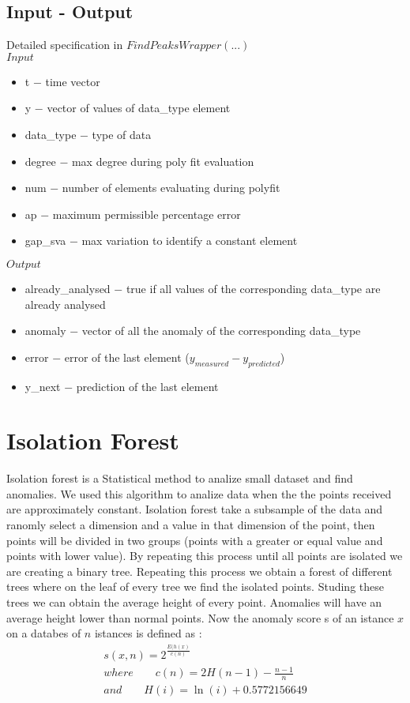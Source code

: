 \documentclass[journal]{IEEEtran}
\begin{document}
\subsection{Input - Output}
Detailed specification in $FindPeaksWrapper(...)$
\\
$Input$
\begin{itemize}
\item t $-$ time vector 
\item y $-$ vector of values of data\_type element
\item data\_type $-$ type of data
\item degree $-$ max degree during poly fit evaluation
\item num $-$ number of elements evaluating during polyfit
\item ap $-$ maximum permissible percentage error
\item gap\_sva $-$ max variation to identify a constant element
\end{itemize}

$Output$
\begin{itemize}
\item already\_analysed $-$ true if all values of the corresponding data\_type are already analysed
\item anomaly $-$ vector of all the anomaly of the corresponding data\_type
\item error $-$ error of the last element ($y_{measured}-y_{predicted}$)
\item y\_next $-$ prediction of the last element
\end{itemize}

\section{Isolation Forest}

Isolation forest is a Statistical method to analize small dataset and find anomalies. We used this algorithm to analize data when the the points received are approximately constant. Isolation forest take a subsample of the data and ranomly select a dimension and a value in that dimension of the point, then points will be divided in two groups (points with a greater or equal value and points with lower value). By repeating this process until all points are isolated we are creating a binary tree. Repeating this process we obtain a forest of different trees where on the leaf of every tree we find the isolated points. Studing these trees we can obtain the average height of every point. Anomalies will have an average height lower than normal points. 
Now the anomaly score s of an istance $x$ on a databes of $n$ istances is defined as :
\begin{gather}
s(x,n)=2^{\frac{E(h(x)}{c(n)}} \\
where \qquad c(n)=2H(n - 1) - \frac{n - 1}{n} \\
and \qquad H(i)=\ln (i) + 0.5772156649
\end{gather}
\end{document}
